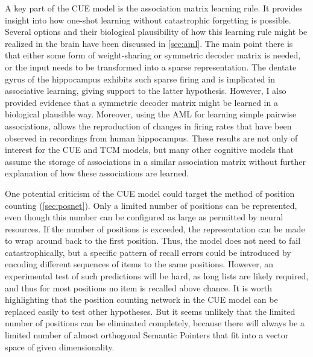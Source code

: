 A key part of the CUE model is the association matrix learning rule.
It provides insight into how one-shot learning without catastrophic forgetting is possible.
Several options and their biological plausibility of how this learning rule might be realized in the brain have been discussed in \cref{sec:aml}.
The main point there is that either some form of weight-sharing or symmetric decoder matrix is needed, or the input needs to be transformed into a sparse representation.
The dentate gyrus of the hippocampus exhibits such sparse firing and is implicated in associative learning, giving support to the latter hypothesis.
However, I also provided evidence that a symmetric decoder matrix might be learned in a biological plausible way.
Moreover, using the AML for learning simple pairwise associations, allows the reproduction of changes in firing rates that have been observed in recordings from human hippocampus.
These results are not only of interest for the CUE and TCM models, but many other cognitive models that assume the storage of associations in a similar association matrix without further explanation of how these associations are learned.

One potential criticism of the CUE model could target the method of position counting (\cref{sec:posnet}).
Only a limited number of positions can be represented, even though this number can be configured as large as permitted by neural resources.
If the number of positions is exceeded, the representation can be made to wrap around back to the first position.
Thus, the model does not need to fail catastrophically, but a specific pattern of recall errors could be introduced by encoding different sequences of items to the same positions.
However, an experimental test of such predictions will be hard, as long lists are likely required, and thus for most positions no item is recalled above chance.
It is worth highlighting that the position counting network in the CUE model can be replaced easily to test other hypotheses.
But it seems unlikely that the limited number of positions can be eliminated completely, because there will always be a limited number of almost orthogonal Semantic Pointers that fit into a vector space of given dimensionality.




